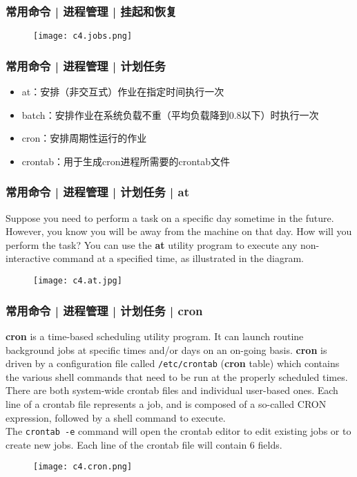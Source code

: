 \begin{frame}
  \frametitle{常用命令 | 进程管理 | 挂起和恢复}
  \begin{figure}
    \centering
    \texttt{[image: c4.jobs.png]}
  \end{figure}
\end{frame}

\begin{frame}
  \frametitle{常用命令 | 进程管理 | \alert{计划任务}}
  \begin{itemize}
    \item at：安排（非交互式）作业在指定时间执行一次
    \item batch：安排作业在系统负载不重（平均负载降到0.8以下）时执行一次
    \item cron：安排周期性运行的作业
    \item crontab：用于生成cron进程所需要的crontab文件
  \end{itemize}
\end{frame}

\begin{frame}
  \frametitle{常用命令 | 进程管理 | 计划任务 | at}
  Suppose you need to perform a task on a specific day sometime in the future. However, you know you will be away from the machine on that day. How will you perform the task? You can use the \textbf{at} utility program to execute any non-interactive command at a specified time, as illustrated in the diagram.
  \begin{figure}
    \centering
    \texttt{[image: c4.at.jpg]}
  \end{figure}
\end{frame}

\begin{frame}[fragile]
  \frametitle{常用命令 | 进程管理 | 计划任务 | cron}
  {\footnotesize
  \textbf{cron} is a time-based scheduling utility program. It can launch routine background jobs at specific times and/or days on an on-going basis.  \textbf{cron} is driven by a configuration file called \verb|/etc/crontab| (\textbf{cron} table) which contains the various shell commands that need to be run at the properly scheduled times. There are both system-wide crontab files and individual user-based ones. Each line of a crontab file represents a job, and is composed of a so-called CRON expression, followed by a shell command to execute.\\
  The \verb|crontab -e| command will open the crontab editor to edit existing jobs or to create new jobs. Each line of the crontab file will contain 6 fields.\\
  }
  \vspace{-0.2cm}
  \begin{figure}
    \centering
    \texttt{[image: c4.cron.png]}
  \end{figure}
\end{frame}

